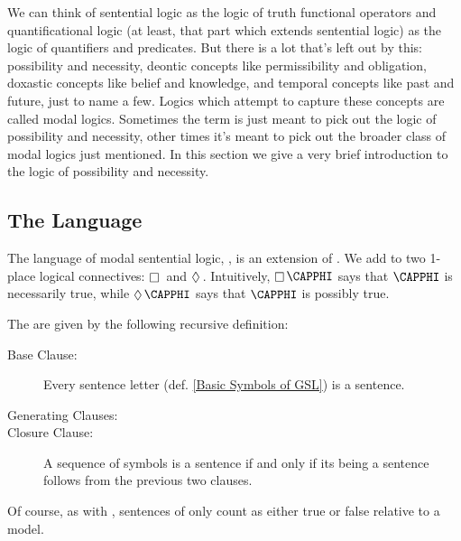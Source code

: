 We can think of sentential logic as the logic of truth functional operators and quantificational logic (at least, that part which extends sentential logic) as the logic of quantifiers and predicates. 
But there is a lot that's left out by this: possibility and necessity, deontic concepts like permissibility and obligation, doxastic concepts like belief and knowledge, and temporal concepts like past and future, just to name a few. 
Logics which attempt to capture these concepts are called modal logics. 
Sometimes the term  is just meant to pick out the logic of possibility and necessity, other times it's meant to pick out the broader class of modal logics just mentioned.
In this section we give a very brief introduction to the logic of possibility and necessity. 

\subsection{The Language \MGSL{}}
The language of modal sentential logic, \MGSL{}, is an extension of \GSL{}. 
We add to \GSL{} two 1-place logical connectives: $\BOX$ and $\DIAMOND$.  
Intuitively, $\BOX\CAPPHI$ says that $\CAPPHI$ is necessarily true, while $\DIAMOND\CAPPHI$ says that $\CAPPHI$ is possibly true. 
\begin{majorILnc}{} The   are given by the following recursive definition:
\begin{description}
\item[Base Clause:] Every sentence letter (def. \ref{Basic Symbols of GSL}) is a sentence.
\item[Generating Clauses:] \hfill
{}
\item[Closure Clause:] A sequence of symbols is a \MGSL{} sentence if and only if its being a sentence follows from the previous two clauses.
\end{description}
\end{majorILnc}
\noindent{}Of course, as with \GSL{}, sentences of \MGSL{} only count as either true or false relative to a model.

